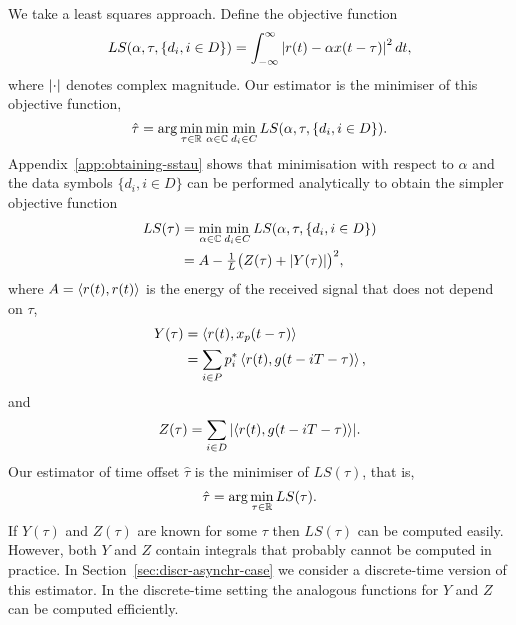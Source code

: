 \documentclass[journal]{IEEEtranTCOM}
\begin{document}
We take a least squares approach.  Define the objective function
\begin{equation}\label{eq:LSatd}
LS(\alpha,\tau,\{d_i, i \in D\}) = \int_{-\infty}^{\infty}\abs{ r(t) - \alpha x(t - \tau) }^2 \, dt,
\end{equation}
where ${\left\vert \cdot \right\vert}$ denotes complex magnitude.  Our estimator is the minimiser of this objective function,
\[
\hat{\tau} = \arg\min_{\tau \in {\mathbb R}} \min_{\alpha \in {\mathbb C}} \min_{d_i \in C} LS(\alpha,\tau,\{d_i, i \in D\}).
\]
Appendix~\ref{app:obtaining-sstau} shows that minimisation with respect to $\alpha$ and the data symbols $\{d_i, i \in D\}$ can be performed analytically to obtain the simpler objective function
\begin{align} 
LS(\tau) &= \min_{\alpha \in \complex} \min_{d_i \in C} LS(\alpha,\tau,\{d_i, i \in D\}) \nonumber \\
&= A - \tfrac{1}{L} \big(Z(\tau) + \abs{Y(\tau)}\big)^2, \label{eq:LSt}
\end{align}
where $A = \left\langle r(t) , r(t) \right\rangle$ is the energy of the received signal that does not depend on $\tau$,
\begin{align}
Y(\tau) &=  \dotprod{r(t)}{x_p(t- \tau)} \nonumber \\
&= \sum_{i \in P} p_i^*\dotprod{r(t)}{g(t - iT - \tau)}, \label{eq:defnY}
\end{align}
and
\begin{equation}\label{eq:defnZ}
Z(\tau) = \sum_{i \in D} \abs{\dotprod{r(t)}{g(t - iT - \tau)}}.
\end{equation}
Our estimator of time offset $\hat{\tau}$ is the minimiser of $LS(\tau)$, that is,
\[
\hat{\tau} = \arg\min_{\tau \in {\mathbb R}} LS(\tau).
\]
If $Y(\tau)$ and $Z(\tau)$ are known for some $\tau$ then $LS(\tau)$ can be computed easily.  However, both $Y$ and $Z$ contain integrals that probably cannot be computed in practice.  In Section~\ref{sec:discr-asynchr-case} we consider a discrete-time version of this estimator.  In the discrete-time setting the analogous functions for $Y$ and $Z$ can be computed efficiently. %
\end{document}

